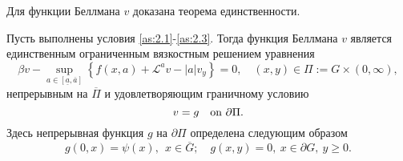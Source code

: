 Для функции Беллмана $v$ доказана теорема единственности.
\begin{theorem} \label{th:2.1}
Пусть выполнены условия \ref{as:2.1}-\ref{as:2.3}. Тогда функция Беллмана $v$ является единственным ограниченным вязкостным решением уравнения
\begin{equation} \label{eq:2.2.4}
\beta v- \sup_{a \in [\underline a, \overline a]} \left\{f(x,a)+ \mathcal L^a v-|a|v_y \right\}=0,\quad (x,y)\in \Pi:=G\times (0,\infty),
\end{equation}
непрерывным на $\overline\Pi$ и удовлетворяющим граничному условию
\begin{equation} \label{eq:2.2.15}
v=g\quad \textnormal{on\ } \partial\Pi.
\end{equation}
Здесь непрерывная функция $g$ на $\partial\Pi$ определена следующим образом
\begin{equation} \label{eq:2.2.14}
g(0,x)=\psi(x),\ \ x\in\overline G;\quad g(x,y)=0,\ x\in\partial G,\ y\ge 0.
\end{equation}
\end{theorem}

